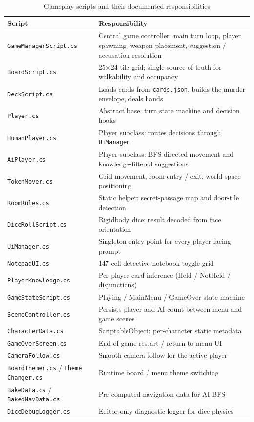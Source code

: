 \begin{table}[H]
\centering
\small
\footnotesize
\begin{tabular}{|p{4cm}|p{10cm}|}
\hline
\textbf{Script} & \textbf{Responsibility} \\ \hline
\texttt{GameManagerScript.cs} & Central game controller: main turn loop, player
spawning, weapon placement, suggestion / accusation resolution \\ \hline
\texttt{BoardScript.cs} & 25$\times$24 tile grid; single source of truth for
walkability and occupancy \\ \hline
\texttt{DeckScript.cs} & Loads cards from \texttt{cards.json}, builds the
murder envelope, deals hands \\ \hline
\texttt{Player.cs} & Abstract base: turn state machine and decision hooks \\ \hline
\texttt{HumanPlayer.cs} & Player subclass: routes decisions through
\texttt{UiManager} \\ \hline
\texttt{AiPlayer.cs} & Player subclass: BFS-directed movement and
knowledge-filtered suggestions \\ \hline
\texttt{TokenMover.cs} & Grid movement, room entry / exit, world-space
positioning \\ \hline
\texttt{RoomRules.cs} & Static helper: secret-passage map and door-tile
detection \\ \hline
\texttt{DiceRollScript.cs} & Rigidbody dice; result decoded from face
orientation \\ \hline
\texttt{UiManager.cs} & Singleton entry point for every player-facing prompt \\ \hline
\texttt{NotepadUI.cs} & 147-cell detective-notebook toggle grid \\ \hline
\texttt{PlayerKnowledge.cs} & Per-player card inference (Held / NotHeld /
disjunctions) \\ \hline
\texttt{GameStateScript.cs} & Playing / MainMenu / GameOver state machine \\ \hline
\texttt{SceneController.cs} & Persists player and AI count between menu and
game scenes \\ \hline
\texttt{CharacterData.cs} & ScriptableObject: per-character static metadata \\ \hline
\texttt{GameOverScreen.cs} & End-of-game restart / return-to-menu UI \\ \hline
\texttt{CameraFollow.cs} & Smooth camera follow for the active player \\ \hline
\texttt{BoardThemer.cs} / \texttt{Theme Changer.cs} & Runtime board / menu
theme switching \\ \hline
\texttt{BakeData.cs} / \texttt{BakedNavData.cs} & Pre-computed navigation data
for AI BFS \\ \hline
\texttt{DiceDebugLogger.cs} & Editor-only diagnostic logger for dice physics \\ \hline
\end{tabular}
\caption{Gameplay scripts and their documented responsibilities}
\end{table}

